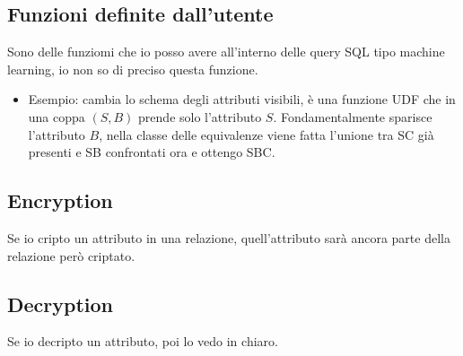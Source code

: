 \documentclass{report}
\begin{document}
\subsection{Funzioni definite dall'utente}
Sono delle funziomi che io posso avere all'interno delle query SQL tipo machine learning, io non so di preciso questa funzione.
\begin{itemize}
    \item Esempio: cambia lo schema degli attributi visibili, è una funzione UDF che in una coppa $(S,B)$ prende solo l'attributo $S$.
    Fondamentalmente sparisce l'attributo $B$, nella classe delle equivalenze viene fatta l'unione tra SC già presenti e SB confrontati ora e ottengo SBC.
\end{itemize}


\subsection{Encryption}
Se io cripto un attributo in una relazione, quell'attributo sarà ancora parte della relazione però criptato.

\subsection{Decryption}
Se io decripto un attributo, poi lo vedo in chiaro.
\end{document}
